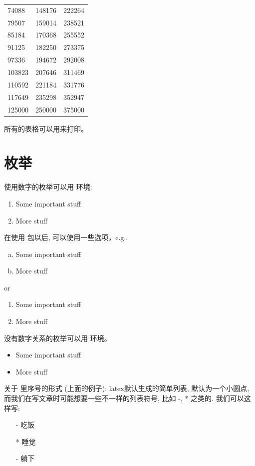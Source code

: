 \begin{center}
\begin{longtable}{l|l|l}
 74088 & 148176 & 222264 \\
 79507 & 159014 & 238521 \\
 85184 & 170368 & 255552 \\
 91125 & 182250 & 273375 \\
 97336 & 194672 & 292008 \\
 103823 & 207646 & 311469 \\
 110592 & 221184 & 331776 \\
 117649 & 235298 & 352947 \\
 125000 & 250000 & 375000 \\
\end{longtable}
\end{center}

所有的表格可以用来打印。


\section{枚举}

使用数字的枚举可以用 环境:
\begin{enumerate}
\item
	Some important stuff
\item
	More stuff
\end{enumerate}
在使用 包以后, 可以使用一些选项，e.g.,
\begin{enumerate}[a)]
\item
	Some important stuff
\item
	More stuff
\end{enumerate}
or 
\begin{enumerate}[~~~1)]
\item
	Some important stuff
\item
	More stuff
\end{enumerate}

没有数字关系的枚举可以用 环境。
\begin{itemize}
\item
	Some important stuff
\item
	More stuff
\end{itemize}

关于 里序号的形式 (上面的例子): latex默认生成的简单列表, 
默认为一个小圆点, 而我们在写文章时可能想要一些不一样的列表符号, 
比如 -, * 之类的. 我们可以这样写:
\begin{itemize}
    \item[-] 吃饭
    \item[*] 睡觉
    \item[-] 躺下
\end{itemize}

